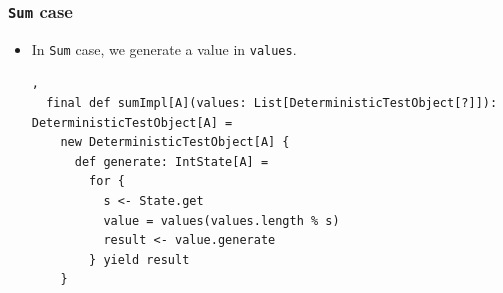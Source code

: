 \begin{frame}[fragile]
  \frametitle{ \lstinline|Sum| case}

  \begin{itemize}
    \item In \lstinline|Sum| case, we generate a value in \lstinline|values|.
\begin{lstlisting}[style=scala],
  final def sumImpl[A](values: List[DeterministicTestObject[?]]): DeterministicTestObject[A] =
    new DeterministicTestObject[A] {
      def generate: IntState[A] =
        for {
          s <- State.get
          value = values(values.length % s)
          result <- value.generate
        } yield result
    }
\end{lstlisting}
  \end{itemize}

\end{frame}







